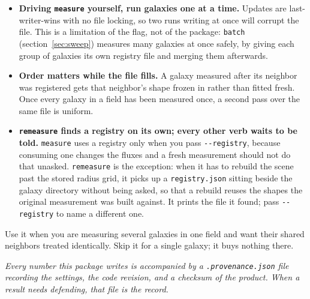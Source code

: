 \documentclass[11pt]{article}
\begin{document}
\begin{itemize}
  \item \textbf{Driving \texttt{measure} yourself, run galaxies one at a
        time.} Updates are last-writer-wins with no file locking, so two
        runs writing at once will corrupt the file. This is a limitation
        of the flag, not of the package: \texttt{batch}
        (section~\ref{sec:sweep}) measures many galaxies at once safely,
        by giving each group of galaxies its own registry file and merging
        them afterwards.
  \item \textbf{Order matters while the file fills.} A galaxy measured
        after its neighbor was registered gets that neighbor's shape
        frozen in rather than fitted fresh. Once every galaxy in a field
        has been measured once, a second pass over the same file is
        uniform.
  \item \textbf{\texttt{remeasure} finds a registry on its own; every
        other verb waits to be told.} \texttt{measure} uses a registry
        only when you pass \texttt{-{}-registry}, because consuming one
        changes the fluxes and a fresh measurement should not do that
        unasked. \texttt{remeasure} is the exception: when it has to
        rebuild the scene past the stored radius grid, it picks up a
        \texttt{registry.json} sitting beside the galaxy directory
        without being asked, so that a rebuild reuses the shapes the
        original measurement was built against. It prints the file it
        found; pass \texttt{-{}-registry} to name a different one.
\end{itemize}

Use it when you are measuring several galaxies in one field and want their
shared neighbors treated identically. Skip it for a single galaxy; it buys
nothing there.

\begin{notebox}
\emph{Every number this package writes is accompanied by a
\textup{\texttt{.provenance.json}} file recording the settings, the code
revision, and a checksum of the product. When a result needs defending,
that file is the record.}
\end{notebox}
\end{document}
